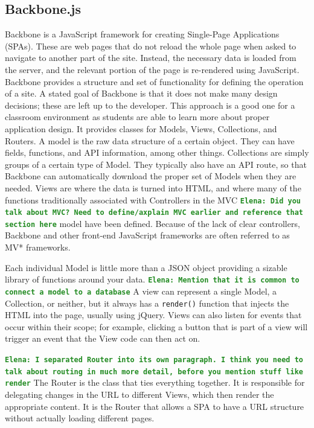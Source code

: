 \documentclass[12pt]{article}
\newcommand{\comment}[1]{{\bf \tt  {#1}}}
\newcommand{\emcomment}[1]{\textcolor{ForestGreen}{\comment{Elena: {#1}}}}
\newcommand{\code}[1]{{\texttt {#1}}}
\begin{document}

\subsection{Backbone.js}\label{sec:backbone}
Backbone is a JavaScript framework for creating Single-Page Applications (SPAs). These are web pages that do not reload the whole page when asked to navigate to another part of the site. Instead, the necessary data is loaded from the server, and the relevant portion of the page is re-rendered using JavaScript. Backbone provides a structure and set of functionality for defining the operation of a site. A stated goal of Backbone is that it does not make many design decisions; these are left up to the developer. This approach is a good one for a classroom environment as students are able to learn more about proper application design. It provides classes for Models, Views, Collections, and Routers. A model is the raw data structure of a certain object. They can have fields, functions, and API information, among other things. Collections are simply groups of a certain type of Model. They typically also have an API route, so that Backbone can automatically download the proper set of Models when they are needed. Views are where the data is turned into HTML, and where many of the functions traditionally associated with Controllers in the MVC \emcomment{Did you talk about MVC? Need to define/axplain MVC earlier and reference that section here} model have been defined. Because of the lack of clear controllers, Backbone and other front-end JavaScript frameworks are often referred to as MV* frameworks. 

Each individual Model is little more than a JSON object providing a sizable library of functions around your data. 
\emcomment{Mention that it is common to connect a model to a database}
A view can represent a single Model, a Collection, or neither, but it always has a \code{render()} function that injects the HTML into the page, usually using jQuery. Views can also listen for events that occur within their scope; for example, clicking a button that is part of a view will trigger an event that the View code can then act on. 

\emcomment{I separated Router into its own paragraph. I think you need to talk about routing in much more detail, before you mention stuff like \code{render}}
The Router is the class that ties everything together. It is responsible for delegating changes in the URL to different Views, which then render the appropriate content. It is the Router that allows a SPA to have a URL structure without actually loading different pages.
\end{document}
